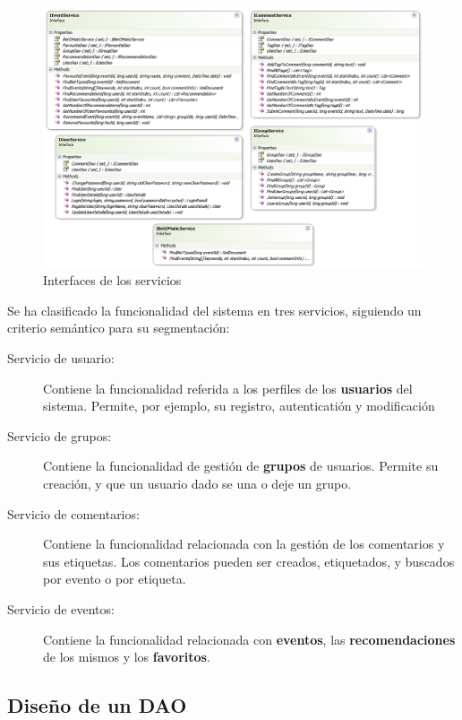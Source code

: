 \documentclass[a4paper,twoside]{article}
\begin{document}
\begin{figure}[H]
  \centering
  \caption{Interfaces de los servicios}
  \includegraphics[width=1.1\textwidth]{img/UML_Service_interfaces.png}
\end{figure}

Se ha clasificado la funcionalidad del sistema en tres servicios, siguiendo un criterio semántico para su segmentación:

\begin{description}
\item[Servicio de usuario:] Contiene la funcionalidad referida a los perfiles de los {\bf usuarios} del sistema. Permite, por ejemplo, su registro, autenticatión y modificación
\item[Servicio de grupos:] Contiene la funcionalidad de gestión de {\bf grupos} de usuarios. Permite su creación, y que un usuario dado se una o deje un grupo.
\item[Servicio de comentarios:] Contiene la funcionalidad relacionada con la gestión de los comentarios y sus etiquetas. Los comentarios pueden ser creados, etiquetados, y buscados por evento o por etiqueta.
\item[Servicio de eventos:] Contiene la funcionalidad relacionada con {\bf eventos}, las {\bf recomendaciones} de los mismos y los {\bf favoritos}.
\end{description}


\subsection{Diseño de un DAO}
\end{document}
